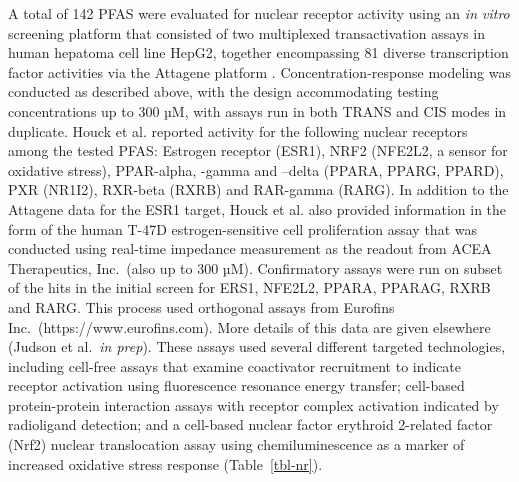 \documentclass[
  super,
  preprint,
  3p]{elsarticle}
\begin{document}
A total of 142 PFAS were evaluated for nuclear receptor activity using
an \emph{in vitro} screening platform that consisted of two multiplexed
transactivation assays in human hepatoma cell line HepG2, together
encompassing 81 diverse transcription factor activities via the Attagene
platform \citep{houck_bioactivity_2021}. Concentration-response modeling
was conducted as described above, with the design accommodating testing
concentrations up to 300 µM, with assays run in both TRANS and CIS modes
in duplicate. Houck et al. \citep{houck_bioactivity_2021} reported
activity for the following nuclear receptors among the tested PFAS:
Estrogen receptor (ESR1), NRF2 (NFE2L2, a sensor for oxidative stress),
PPAR-alpha, -gamma and --delta (PPARA, PPARG, PPARD), PXR (NR1I2),
RXR-beta (RXRB) and RAR-gamma (RARG). In addition to the Attagene data
for the ESR1 target, Houck et al. \citep{houck_bioactivity_2021} also
provided information in the form of the human T-47D estrogen-sensitive
cell proliferation assay that was conducted using real-time impedance
measurement as the readout from ACEA Therapeutics, Inc.~(also up to 300
µM). Confirmatory assays were run on subset of the hits in the initial
screen for ERS1, NFE2L2, PPARA, PPARAG, RXRB and RARG. This process used
orthogonal assays from Eurofins Inc.~(https://www.eurofins.com). More
details of this data are given elsewhere (Judson et al.~\emph{in prep}).
These assays used several different targeted technologies, including
cell-free assays that examine coactivator recruitment to indicate
receptor activation using fluorescence resonance energy transfer;
cell-based protein-protein interaction assays with receptor complex
activation indicated by radioligand detection; and a cell-based nuclear
factor erythroid 2-related factor (Nrf2) nuclear translocation assay
using chemiluminescence as a marker of increased oxidative stress
response (Table~\ref{tbl-nr}).
\end{document}
